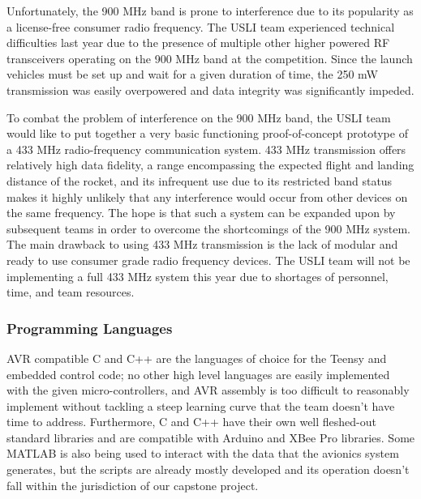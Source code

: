 \documentclass[journal,10pt,draftclsnofoot,onecolumn,compsoc]{IEEEtran} \usepackage[margin=0.75in]{geometry}
\begin{document}
\noindent Unfortunately, the 900 MHz band is prone to interference due to its popularity as a license-free consumer radio frequency. The USLI team experienced technical difficulties last year due to the presence of multiple other higher powered RF transceivers operating on the 900 MHz band at the competition. Since the launch vehicles must be set up and wait for a given duration of time, the 250 mW transmission was easily overpowered and data integrity was significantly impeded.\newline

\noindent To combat the problem of interference on the 900 MHz band, the USLI team would like to put together a very basic functioning proof-of-concept prototype of a 433 MHz radio-frequency communication system. 433 MHz transmission offers relatively high data fidelity, a range encompassing the expected flight and landing distance of the rocket, and its infrequent use due to its restricted band status makes it highly unlikely that any interference would occur from other devices on the same frequency. The hope is that such a system can be expanded upon by subsequent teams in order to overcome the shortcomings of the 900 MHz system. The main drawback to using 433 MHz transmission is the lack of modular and ready to use consumer grade radio frequency devices. The USLI team will not be implementing a full 433 MHz system this year due to shortages of personnel, time, and team resources.


\subsubsection{Programming Languages}
AVR compatible C and C++ are the languages of choice for the Teensy and embedded control code; no other high level languages are easily implemented with the given micro-controllers, and AVR assembly is too difficult to reasonably implement without tackling a steep learning curve that the team doesn't have time to address. Furthermore, C and C++ have their own well fleshed-out standard libraries and are compatible with Arduino and XBee Pro libraries. Some MATLAB is also being used to interact with the data that the avionics system generates, but the scripts are already mostly developed and its operation doesn't fall within the jurisdiction of our capstone project.

\newpage
\end{document}
